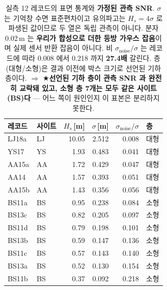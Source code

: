 \documentclass[11pt]{report}
\numberwithin{equation}{chapter}
\numberwithin{figure}{chapter}
\numberwithin{table}{chapter}
\begin{document}
\begin{table}[htbp]
\centering
\small
\caption{실측 12 레코드의 표면 통계와 \textbf{가정된 관측 SNR}.
$\sigma$ 는 기억창 수면 표준편차이고 유의파고는 $H_s = 4\sigma$ 로 파생된 값이므로
두 열은 독립 관측이 아니다. 분자 0.02\,m 는 \textbf{우리가 합성으로 더한
등방 가우스 잡음}이며 실제 센서 반환 잡음이 아니다.
비 $\sigma_\text{noise}/\sigma$ 는 레코드에 따라
0.008 에서 0.218 까지 \textbf{27.4배} 갈린다.
층(대형/소형)은 결과 이전에 박스 크기로 선언된 기하 층이다.
$\Rightarrow$ ★\textbf{선언된 기하 층이 관측 SNR 과 완전히 교락돼 있고,
소형 층 7개는 모두 같은 사이트(BS)다} --- 어느 쪽이 원인인지 이 표본은 분리하지 못한다.}
\label{tab:real_noise_ratio}
\begin{tabular}{llrrrl}
\toprule
레코드 & 사이트 & $H_s$\,[m] & $\sigma$\,[m] & $\sigma_\text{noise}/\sigma$ & 층 \\
\midrule
LJ18a & LJ & 10.05 & 2.512 & 0.008 & 대형 \\
YS17 & YS & 1.93 & 0.483 & 0.041 & 대형 \\
AA15a & AA & 1.72 & 0.429 & 0.047 & 대형 \\
AA14 & AA & 1.57 & 0.393 & 0.051 & 대형 \\
AA15b & AA & 1.43 & 0.356 & 0.056 & 대형 \\
BS11a & BS & 0.95 & 0.238 & 0.084 & 소형 \\
BS13c & BS & 0.82 & 0.205 & 0.097 & 소형 \\
BS11d & BS & 0.79 & 0.198 & 0.101 & 소형 \\
BS13b & BS & 0.59 & 0.147 & 0.136 & 소형 \\
BS11c & BS & 0.57 & 0.143 & 0.140 & 소형 \\
BS13a & BS & 0.52 & 0.130 & 0.154 & 소형 \\
BS11b & BS & 0.37 & 0.092 & 0.218 & 소형 \\
\bottomrule
\end{tabular}
\end{table}
\end{document}
